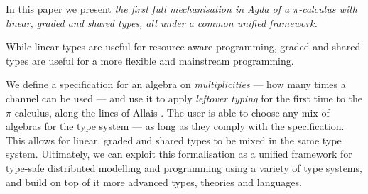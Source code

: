 \documentclass[sigplan,10pt,anonymous,review]{acmart}
\theoremstyle{definition}
\newcommand{\picalc}{$\pi$-calculus}
\begin{document}
In this paper we present \emph{the first full mechanisation in Agda of a \picalc{} with linear, graded and shared types, all under a common unified framework.}

While linear types are useful for resource-aware programming, graded and shared types are useful for a more flexible and 
mainstream programming.

We define a specification for an algebra on \emph{multiplicities} --- how many times a channel can be used --- and use it to apply \emph{leftover typing} for the first time to the \picalc{}, along the lines of Allais \cite{Allais2018a}.
The user is able to choose any mix of algebras for the type system --- as long as they comply with the specification.
This allows for linear, graded and shared types to be mixed in the same type system.
Ultimately, we can exploit this formalisation as a unified framework for type-safe distributed modelling and programming using a variety of type systems, and build on top of it more advanced types, theories and languages.
\end{document}
